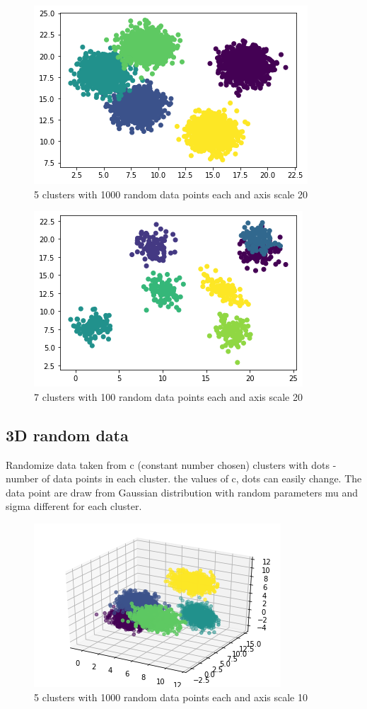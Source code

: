 \documentclass[12pt, a4paper]{paper}
\begin{document}
\begin{figure}[h!]
\centering
\includegraphics[scale=0.6]{5_c_1000_dots_20_scale.png}
\caption{5 clusters with 1000 random data points each and axis scale 20}
\label{fig:2D_1}
\end{figure}


\begin{figure}[h!]
\centering
\includegraphics[scale=0.6]{7_c_100_dots_20_scale.png}
\caption{7 clusters with 100 random data points each and axis scale 20}
\label{fig:2D_2}
\end{figure}


\subsection*{3D random data}
Randomize data taken from c (constant number chosen) clusters with dots - number of data points in each cluster. the values of c, dots can easily change. 
The data point are draw from Gaussian distribution with random parameters mu and sigma different for each cluster.

\begin{figure}[h!]
\centering
\includegraphics[scale=0.7]{c_5_1000_dots_spred_10.png}
\caption{5 clusters with 1000 random data points each and axis scale 10}
\label{fig:3D_1}
\end{figure}
\end{document}
